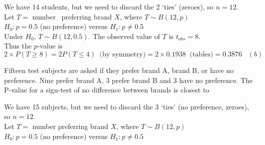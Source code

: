 \documentclass[bigtut]{tutorial}
\begin{document}
\begin{tutorial}
\begin{questions}
\begin{solution}
  We have 14 students, but we need to discard the 2 `ties' (zeroes), so $n=12$. \\
Let $T=$ number \ preferring brand $X$, where $T \sim B(12,p)$  \\

  $H_0\colon p=0.5$ (no preference) versus $H_1\colon p \neq 0.5$ \\

  Under $H_0$, $T  \sim B(12,0.5)$. The observed value of $T$ is $t_{obs}=8$.  \\

 Thus the $p$-value is 
\[ 2 \times P(T \geq 8)  = 2P(T \leq 4) \ \text{ (by symmetry)} = 2 \times 0.1938 \ \text{ (tables)} = 0.3876 \;\;\; (b) \]
\end{solution}

\question
Fifteen test subjects are asked if they prefer brand A, brand B, or have no preference. Nine prefer brand A, 3 prefer brand B and 3 have no preference. The P-value for a sign-test of no difference between brands is closest to

\begin{solution}
  We have 15 subjects, but we need to discard the 3 `ties' (no preference, zeroes), so $n=12$. \\
Let $T=$ number preferring brand $X$, where $T \sim B(12,p)$  \\

  $H_0\colon p=0.5$ (no preference) versus $H_1\colon p \neq 0.5$ \\


\end{solution}
\end{questions}
\end{tutorial}
\end{document}
